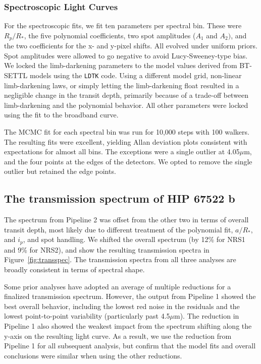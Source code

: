 \documentclass[twocolumn]{aastex63} %
\newcommand{\um}{$\mu$m}
\newcommand{\plname}{HIP 67522 b}
\begin{document}
 \subsubsection{Spectroscopic Light Curves}

For the spectroscopic fits, we fit ten parameters per spectral bin. These were $R_p/R_*$, the five polynomial coefficients, two spot amplitudes ($A_1$ and $A_2)$, and the two coefficients for the x- and y-pixel shifts. All evolved under uniform priors. Spot amplitudes were allowed to go negative to avoid Lucy-Sweeney-type bias. We locked the limb-darkening parameters to the model values derived from BT-SETTL models using the \texttt{LDTK} code. Using a different model grid, non-linear limb-darkening laws, or simply letting the limb-darkening float resulted in a negligible change in the transit depth, primarily because of a trade-off between limb-darkening and the polynomial behavior. All other parameters were locked using the fit to the broadband curve.  

The MCMC fit for each spectral bin was run for 10,000 steps with 100 walkers. The resulting fits were excellent, yielding Allan deviation plots consistent with expectations for almost all bins. The exceptions were a single outlier at 4.05\um, and the four points at the edges of the detectors. We opted to remove the single outlier but retained the edge points. 

\subsection{The transmission spectrum of \plname}

The spectrum from Pipeline 2 was offset from the other two in terms of overall transit depth, most likely due to different treatment of the polynomial fit, $a/R_*$, and $i_p$, and spot handling. We shifted the overall spectrum (by 12\% for NRS1 and 9\% for NRS2), and show the resulting transmission spectra in Figure~\ref{fig:transspec}. The transmission spectra from all three analyses are broadly consistent in terms of spectral shape. %

Some prior analyses have adopted an average of multiple reductions \citep[e.g.,][]{Alderson2023} for a finalized transmission spectrum. However, the output from Pipeline 1 showed the best overall behavior, including the lowest red noise in the residuals and the lowest point-to-point variability (particularly past 4.5\um). The reduction in Pipeline 1 also showed the weakest impact from the spectrum shifting along the y-axis on the resulting light curve. As a result, we use the reduction from Pipeline 1 for all subsequent analysis, but confirm that the model fits and overall conclusions were similar when using the other reductions. 
\end{document}
